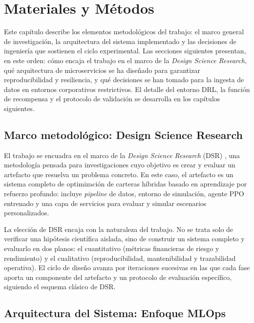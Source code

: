 \documentclass[IB,a4paper]{TFUOC}
\begin{document}
\chapter{Materiales y Métodos}
\label{cap:materiales_y_metodos}

Este capítulo describe los elementos metodológicos del trabajo: el marco general de investigación, la arquitectura del sistema implementado y las decisiones de ingeniería que sostienen el ciclo experimental. Las secciones siguientes presentan, en este orden: cómo encaja el trabajo en el marco de la \textit{Design Science Research}, qué arquitectura de microservicios se ha diseñado para garantizar reproducibilidad y resiliencia, y qué decisiones se han tomado para la ingesta de datos en entornos corporativos restrictivos. El detalle del entorno DRL, la función de recompensa y el protocolo de validación se desarrolla en los capítulos siguientes.

\section{Marco metodológico: Design Science Research}
\label{sec:dsr}

El trabajo se encuadra en el marco de la \textit{Design Science Research} (DSR) \citep{oates2006}, una metodología pensada para investigaciones cuyo objetivo es crear y evaluar un artefacto que resuelva un problema concreto. En este caso, el artefacto es un sistema completo de optimización de carteras híbridas basado en aprendizaje por refuerzo profundo: incluye \textit{pipeline} de datos, entorno de simulación, agente PPO entrenado y una capa de servicios para evaluar y simular escenarios personalizados.

La elección de DSR encaja con la naturaleza del trabajo. No se trata solo de verificar una hipótesis científica aislada, sino de construir un sistema completo y evaluarlo en dos planos: el cuantitativo (métricas financieras de riesgo y rendimiento) y el cualitativo (reproducibilidad, mantenibilidad y trazabilidad operativa). El ciclo de diseño avanza por iteraciones sucesivas en las que cada fase aporta un componente del artefacto y un protocolo de evaluación específico, siguiendo el esquema clásico de DSR.

\section{Arquitectura del Sistema: Enfoque MLOps}
\label{sec:arquitectura}
\end{document}
